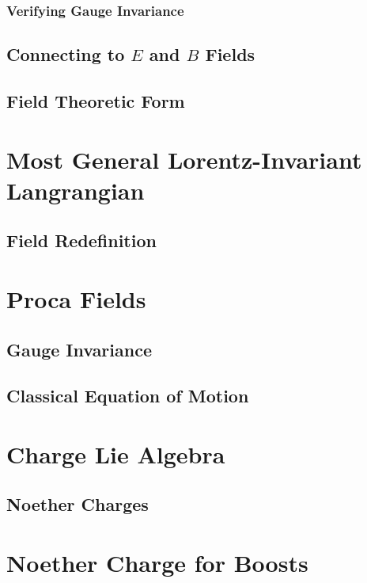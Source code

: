 \documentclass[12pt]{article}
\begin{document}
\subsubsection{Verifying Gauge Invariance}

\subsection{Connecting to $E$ and $B$ Fields}

\subsection{Field Theoretic Form}

\section{Most General Lorentz-Invariant Langrangian}

\subsection{Field Redefinition}

\section{Proca Fields}

\subsection{Gauge Invariance}

\subsection{Classical Equation of Motion}

\section{Charge Lie Algebra}

\subsection{Noether Charges}

\section{Noether Charge for Boosts}
\end{document}
